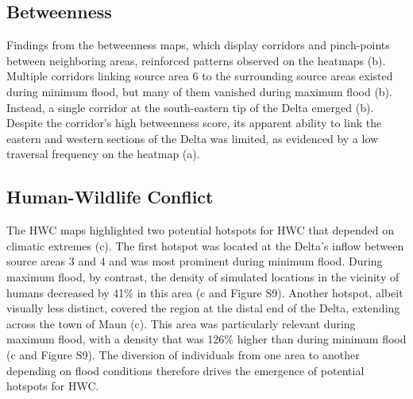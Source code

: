\documentclass[abstract=on,10pt,a4paper,bibliography=totocnumbered]{article}
\begin{document}
\subsection{Betweenness}

Findings from the betweenness maps, which display corridors and pinch-points
between neighboring areas, reinforced patterns observed on the heatmaps
(b). Multiple corridors linking source area 6 to the surrounding
source areas existed during minimum flood, but many of them vanished during
maximum flood (b). Instead, a single corridor at the south-eastern
tip of the Delta emerged (b). Despite the corridor's high
betweenness score, its apparent ability to link the eastern and western sections
of the Delta was limited, as evidenced by a low traversal frequency on the
heatmap (a).

\subsection{Human-Wildlife Conflict}

The HWC maps highlighted two potential hotspots for HWC that depended on
climatic extremes (c). The first hotspot was located at the
Delta's inflow between source areas 3 and 4 and was most prominent during
minimum flood. During maximum flood, by contrast, the density of simulated
locations in the vicinity of humans decreased by 41\% in this area
(c and Figure S9). Another hotspot, albeit visually less distinct,
covered the region at the distal end of the Delta, extending across the town of
Maun (c). This area was particularly relevant during maximum
flood, with a density that was 126\% higher than during minimum flood
(c and Figure S9). The diversion of individuals from one area to
another depending on flood conditions therefore drives the emergence of
potential hotspots for HWC.
\end{document}
